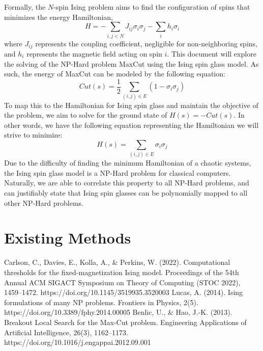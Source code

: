\documentclass[conference]{IEEEtran}
\begin{document}
Formally, the $N$-spin Ising problem aims to find the configuration of spins that minimizes the energy Hamiltonian, 
\begin{equation}
H = -\sum_{i,j<N}J_{ij}\sigma_i\sigma_j - \sum_ih_i\sigma_i
\end{equation}
where $J_{ij}$ represents the coupling coefficient, negligible for non-neighboring spins, and $h_i$ represents the magnetic field acting on spin $i$. This document will explore the solving of the NP-Hard problem MaxCut using the Ising spin glass model. As such, the energy of MaxCut can be modeled by the following equation:
\begin{equation}
Cut(s) = \frac{1}{2}\sum_{(i,j)\in E}(1-\sigma_i\sigma_j)
\end{equation}
To map this to the Hamiltonian for Ising spin glass and maintain the objective of the problem, we aim to solve for the ground state of $H(s) = -Cut(s)$. In other words, we have the following equation representing the Hamiltonian we will strive to minimize:
\begin{equation}
H(s) = \sum_{(i,j)\in E}\sigma_i\sigma_j
\end{equation}
Due to the difficulty of finding the minimum Hamiltonian of a chaotic systems, the Ising spin glass model is a NP-Hard problem for classical computers. Naturally, we are able to correlate this property to all NP-Hard problems, and can justifiably state that Ising spin glasses can be polynomially mapped to all other NP-Hard problems\cite{b2}.

\section{Existing Methods}



\begin{thebibliography}{00}
Carlson, C., Davies, E., Kolla, A., \& Perkins, W. (2022). Computational thresholds for the fixed-magnetization Ising model. Proceedings of the 54th Annual ACM SIGACT Symposium on Theory of Computing (STOC 2022), 1459–1472. https://doi.org/10.1145/3519935.3520003
Lucas, A. (2014). Ising formulations of many NP problems. Frontiers in Physics, 2(5). https://doi.org/10.3389/fphy.2014.00005
Benlic, U., \& Hao, J.-K. (2013). Breakout Local Search for the Max-Cut problem. Engineering Applications of Artificial Intelligence, 26(3), 1162–1173. https://doi.org/10.1016/j.engappai.2012.09.001


\end{thebibliography}
\end{document}

